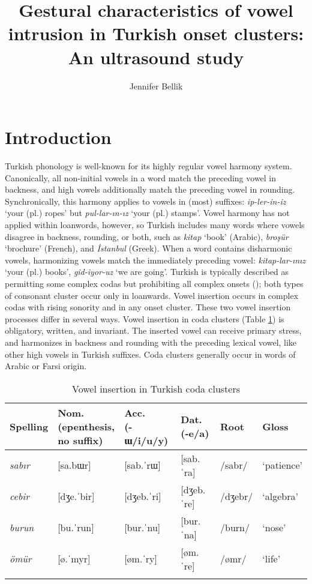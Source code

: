 \documentclass[output=paper,colorlinks,citecolor=brown]{langscibook}
\author{Jennifer Bellik\affiliation{UC Santa Cruz}}
\title[Gestural characteristics of vowel intrusion in Turkish onset clusters]{Gestural characteristics of vowel intrusion in Turkish onset clusters: An ultrasound study}
\begin{document}
\maketitle \label{ch7}

\section{Introduction}
Turkish phonology is well-known for its highly regular vowel harmony system. Canonically, all non-initial vowels in a word match the preceding vowel in backness, and high vowels additionally match the preceding vowel in rounding. Synchronically, this harmony applies to vowels in (most) suffixes: \textit{ip-ler-in-iz} ‘your (pl.) ropes’ but \textit{pul-lar-ın-ız} ‘your (pl.) stamps’. Vowel harmony has not applied within loanwords, however, so Turkish includes many words where vowels disagree in backness, rounding, or both, such as \textit{kitap} ‘book’ (Arabic), \textit{broşür} ‘brochure’ (French), and \textit{İstanbul} (Greek). When a word contains disharmonic vowels, harmonizing vowels match the immediately preceding vowel: \textit{kitap-lar-ınız} ‘your (pl.) books’, \textit{gid-iyor-uz} ‘we are going’. Turkish is typically described as permitting some complex codas but prohibiting all complex onsets (\citealt{ClementsSezer:1982}); both types of consonant cluster occur only in loanwards. Vowel insertion occurs in complex codas with rising sonority and in any onset cluster. These two vowel insertion processes differ in several ways. Vowel insertion in coda clusters (Table \ref{Vinsertion}) is obligatory, written, and invariant. The inserted vowel can receive primary stress, and harmonizes in backness and rounding with the preceding lexical vowel, like other high vowels in Turkish suffixes. Coda clusters generally occur in words of Arabic or Farsi origin.


\begin{table}
\caption{Vowel insertion in Turkish coda clusters}
\label{Vinsertion}
\begin{tabular}{llllll}
\lsptoprule
Spelling & \makecell{Nom.\\(epenthesis,\\ no suffix)} & \makecell{Acc.\\ (-ɯ/i/u/y)} & \makecell{Dat.\\ (-e/a)} & Root & Gloss \\\midrule
\textit{sabır}	& [sa.bɯr] &	[sab.ˈrɯ]	& [sab.ˈra]	& /sabr/	& `patience'\\
\textit{cebir}	& [dʒe.ˈbir]	& [dʒeb.ˈri]	& [dʒeb.ˈre]	& /dʒebr/	& `algebra'\\
\textit{burun}	& [bu.ˈrun]	& [bur.ˈnu]	& [bur.ˈna]	& /burn/	& `nose'\\
\textit{ömür}	& [ø.ˈmyr] &	[øm.ˈry] &	[øm.ˈre] &	/ømr/	& `life' \\
\lspbottomrule                
\end{tabular}
\end{table}
\end{document}
